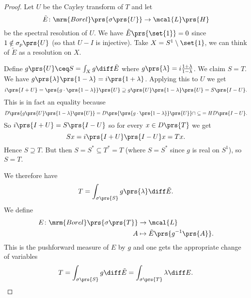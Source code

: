\documentclass[10pt, twoside]{book}
\begin{document}
\begin{proof}
Let $U$ be the Cayley transform of $T$ and let
\begin{align*}
\tilde{E} \colon \mrm{Borel}\prs{\sigma\prs{U}} \to \mcal{L}\prs{H}
\end{align*}
be the spectral resolution of $U$.
We have $\tilde{E}\prs{\set{1}} = 0$ since $1 \notin \sigma_p\prs{U}$ (so that $U-I$ is injective).
Take $X = S^1 \setminus \set{1}$, we can think of $\tilde{E}$ as a resolution on $X$.

Define $g\prs{U} \ceq S = \int_X g \diff \tilde{E}$ where $g\prs{\lambda} = i \frac{1 + \lambda}{1-\lambda}$. We claim $S = T$.
We have
$g\prs{\lambda}\prs{1-\lambda} = i\prs{1+\lambda}$. Applying this to $U$ we get
\[i\prs{I+U} = \prs{g \cdot \prs{1-\lambda}}\prs{U} \supseteq g\prs{U} \prs{1-\lambda}\prs{U} = S \prs{I-U}\text{.}\]
This is in fact an equality because \[D\prs{g\prs{U} \prs{1-\lambda}\prs{U}} = D\prs{\prs{g \cdot \prs{1-\lambda}}\prs{U}} \cap \subseteq{=H}{D\prs{I-U}}\text{.}\]
So
$i\prs{I+U} = S\prs{I-U}$
so for every $x \in D\prs{T}$ we get
\[Sx = i\prs{I+U}\prs{I-U}x = Tx \text{.}\]
Hence $S \supseteq T$.
But then $S = S^* \subseteq T^* = T$ (where $S = S^*$ since $g$ is real on $S^1$), so $S = T$.

We therefore have
\[T = \int_{\sigma\prs{S}} g\prs{\lambda} \diff \tilde{E} \text{.}\]
We define
\begin{align*}
E \colon \mrm{Borel}\prs{\sigma\prs{T}} &\to \mcal{L} \\
A &\mapsto \tilde{E}\prs{g^{-1}\prs{A}} \text{.}
\end{align*}
This is the pushforward measure of $E$ by $g$ and one gets the appropriate change of variables
\[T = \int_{\sigma\prs{S}} g\diff \tilde{E} = \int_{\sigma\prs{T}} \lambda \diff E \text{.}\]
\end{proof}

\end{document}
